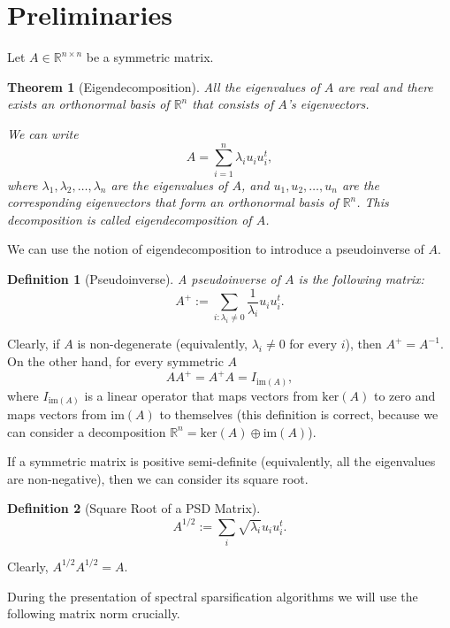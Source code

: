 \documentclass[12pt]{article}
\newtheorem{theorem}{Theorem}
\newtheorem{definition}{Definition}
\begin{document}
    \section{Preliminaries}
    \label{linear_algebra}

    Let $A \in \mathbb{R}^{n \times n}$ be a symmetric matrix. 
    \begin{theorem}[Eigendecomposition]
        All the eigenvalues
        of $A$ are real and there exists an orthonormal basis of $\mathbb{R}^n$
        that consists of $A$'s eigenvectors.

        We can write
        $$
            A = \sum_{i=1}^n \lambda_i u_i u_i^t,
        $$
        where $\lambda_1, \lambda_2, \ldots, \lambda_n$ are the eigenvalues of $A$, and
        $u_1, u_2, \ldots, u_n$ are the corresponding eigenvectors that form an orthonormal
        basis of $\mathbb{R}^n$. This decomposition is called \emph{eigendecomposition}
        of $A$.
    \end{theorem}

    We can use the notion of eigendecomposition to introduce a pseudoinverse of $A$.

    \begin{definition}[Pseudoinverse]
        A \emph{pseudoinverse} of $A$ is the following matrix:
        $$
            A^+ := \sum_{i : \lambda_i \ne 0} \frac{1}{\lambda_i} u_i u_i^t.
        $$
    \end{definition}

    Clearly, if $A$ is non-degenerate (equivalently, $\lambda_i \ne 0$ for every $i$),
    then $A^+ = A^{-1}$.
    On the other hand, for every symmetric $A$
    $$
        A A^+ = A^+ A = I_{\mathrm{im}(A)},
    $$
    where $I_{\mathrm{im}(A)}$ is a linear operator that maps vectors from $\mathrm{ker}(A)$
    to zero and maps vectors from $\mathrm{im}(A)$ to themselves (this definition is correct,
    because we can consider a decomposition
    $\mathbb{R}^n = \mathrm{ker}(A) \oplus \mathrm{im}(A)$).

    If a symmetric matrix is positive semi-definite (equivalently, all the eigenvalues
    are non-negative), then we can consider its square root.

    \begin{definition}[Square Root of a PSD Matrix]
        $$
            A^{1/2} := \sum_{i} \sqrt{\lambda_i} u_i u_i^t.
        $$
    \end{definition}
    Clearly, $A^{1/2} A^{1/2} = A$.

    During the presentation of spectral sparsification algorithms we will use the following
    matrix norm crucially.
\end{document}
